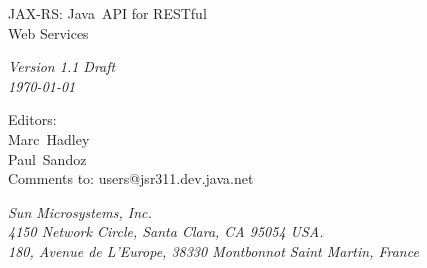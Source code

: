 \begin{titlepage}
\raggedleft

\vspace*{60pt}

{\Huge
\textsf{JAX-RS: Java\texttrademark\ API for RESTful\\\vspace{10pt}
 Web Services}}

\vspace{20pt}

{
\Large\textit{Version 1.1 Draft\\
\today}
}

\vspace{40pt}

{\large Editors:\\
Marc\ Hadley\\
Paul\ Sandoz\\
\vspace{10pt}Comments to: users@jsr311.dev.java.net
}

\vspace{80pt}

{\small\textit{Sun Microsystems, Inc.\\
4150 Network Circle, Santa Clara, CA 95054 USA.\\
180, Avenue de L'Europe, 38330 Montbonnot Saint Martin, France}
}
\end{titlepage} 
